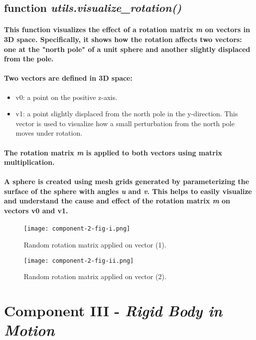 \documentclass[12pt, letterpaper]{article}
\begin{document}
\subsection{function \textit{utils.visualize\_rotation()}}
\paragraph{This function visualizes the effect of a rotation matrix \textit{m} on vectors in 3D space. Specifically, it shows how the rotation affects two vectors: one at the "north pole" of a unit sphere and another slightly displaced from the pole.}
\paragraph{Two vectors are defined in 3D space:}
\begin{itemize}
    \item{v0: a point on the positive z-axis.}
    \item{v1: a point slightly displaced from the north pole in the y-direction. This vector is used to visualize how a small perturbation from the north pole moves under rotation.}
\end{itemize}
\paragraph{The rotation matrix \textit{m} is applied to both vectors using matrix multiplication.}
\paragraph{A sphere is created using mesh grids generated by parameterizing the surface of the sphere with angles \textit{u} and \textit{v}. This helps to easily visualize and understand the cause and effect of the rotation matrix \textit{m} on vectors v0 and v1.}
\begin{figure}[h!]
    \centering
    \texttt{[image: component-2-fig-i.png]}
    \caption{Random rotation matrix applied on vector (1).}
    \label{fig:enter-label}
\end{figure}
\begin{figure}[h!]
    \centering
    \texttt{[image: component-2-fig-ii.png]}
    \caption{Random rotation matrix applied on vector (2).}
    \label{fig:enter-label}
\end{figure}
\section{Component III - \textit{Rigid Body in Motion}}
\end{document}
